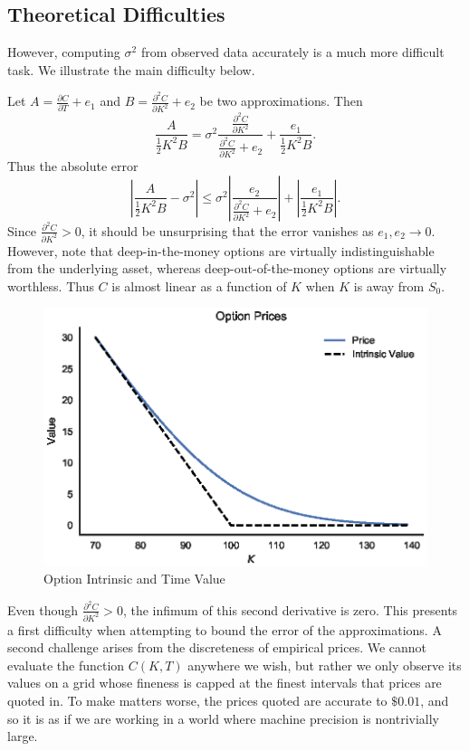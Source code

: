 \documentclass[11pt]{article}
\numberwithin{equation}{section}
\newcommand{\diff}[2]{\frac{\partial #1}{\partial #2}}
\newcommand{\abs}[1]{\left|#1\right|}
\begin{document}
\subsection{Theoretical Difficulties}
However, computing $\sigma^2$ from observed data accurately is a much more
difficult task. We illustrate the main difficulty below.

Let $A = \diff{C}{T} + e_1$ and $B = \diff{^2C}{K^2} + e_2$ be two
approximations. Then \[ \frac{A}{\frac{1}{2}K^2 B} = \sigma^2
\frac{\diff{^2C}{K^2}}{\diff{^2C}{K^2} + e_2} + \frac{e_1}{\frac{1}{2}K^2 B}.
\]
Thus the absolute error \[
\abs{\frac{A}{\frac{1}{2}K^2 B} - \sigma^2} \le \sigma^2
\abs{\frac{e_2}{\diff{^2C}{K^2}+e_2}} + \abs{\frac{e_1}{\frac{1}{2}K^2B}}.
\]
Since $\diff{^2C}{K^2} > 0$, it should be unsurprising that the error vanishes
as $e_1,e_2 \to 0$. However, note that deep-in-the-money options are virtually
indistinguishable from the underlying asset, whereas deep-out-of-the-money
options are virtually worthless. Thus $C$ is almost linear as a function of $K$
when $K$ is away from $S_0$.

\begin{figure}[h]
\centering
\includegraphics{figs/intrinsicvalue}
\caption{Option Intrinsic and Time Value}
\label{fig:intrinsicvalue}
\end{figure}

Even though $\diff{^2C}{K^2} > 0$, the infimum of this second derivative is
zero. This presents a first difficulty when attempting to bound the error of the
approximations. A second challenge arises from the discreteness of empirical
prices. We cannot evaluate the function $C(K,T)$ anywhere we wish, but rather we
only observe its values on a grid whose fineness is capped at the finest
intervals that prices are quoted in. To make matters worse, the prices quoted
are accurate to $\$0.01$, and so it is as if we are working in a world where
machine precision is nontrivially large.
\end{document}
